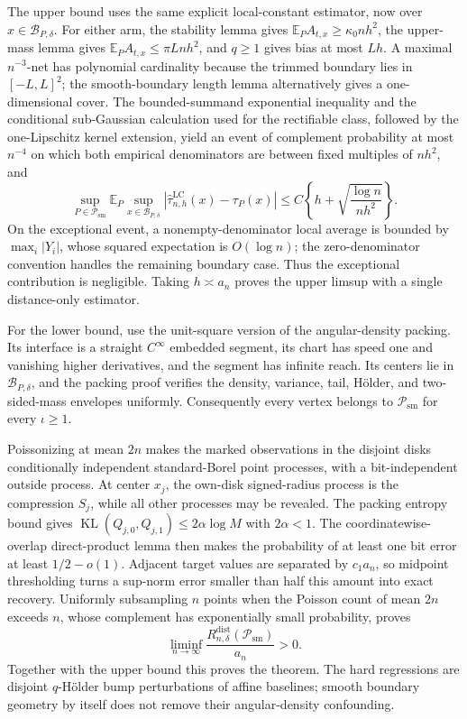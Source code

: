 The upper bound uses the same explicit local-constant estimator, now over \(x\in\mathcal B_{P,\delta}\).  For either arm, the stability lemma gives
\(\mathbb E_PA_{t,x}\geq\kappa_0nh^2\), the upper-mass lemma gives \(\mathbb E_PA_{t,x}\leq\pi Lnh^2\), and \(q\geq1\) gives bias at most \(Lh\).  A maximal \(n^{-3}\)-net has polynomial cardinality because the trimmed boundary lies in \([-L,L]^2\); the smooth-boundary length lemma alternatively gives a one-dimensional cover.  The bounded-summand exponential inequality and the conditional sub-Gaussian calculation used for the rectifiable class, followed by the one-Lipschitz kernel extension, yield an event of complement probability at most \(n^{-4}\) on which both empirical denominators are between fixed multiples of \(nh^2\), and
\[
 \sup_{P\in\mathcal P_{\mathrm{sm}}}
 \mathbb E_P\sup_{x\in\mathcal B_{P,\delta}}
 |\widehat\tau^{\mathrm{LC}}_{n,h}(x)-\tau_P(x)|
 \leq C\left\{h+\sqrt{\frac{\log n}{nh^2}}\right\}.
\]
On the exceptional event, a nonempty-denominator local average is bounded by \(\max_i|Y_i|\), whose squared expectation is \(O(\log n)\); the zero-denominator convention handles the remaining boundary case.  Thus the exceptional contribution is negligible.  Taking \(h\asymp a_n\) proves the upper limsup with a single distance-only estimator.

For the lower bound, use the unit-square version of the angular-density packing.  Its interface is a straight \(C^\infty\) embedded segment, its chart has speed one and vanishing higher derivatives, and the segment has infinite reach.  Its centers lie in \(\mathcal B_{P,\delta}\), and the packing proof verifies the density, variance, tail, H\"older, and two-sided-mass envelopes uniformly.  Consequently every vertex belongs to \(\mathcal P_{\mathrm{sm}}\) for every \(\iota\geq1\).

Poissonizing at mean \(2n\) makes the marked observations in the disjoint disks conditionally independent standard-Borel point processes, with a bit-independent outside process.  At center \(x_j\), the own-disk signed-radius process is the compression \(S_j\), while all other processes may be revealed.  The packing entropy bound gives
\(\operatorname{KL}(Q_{j,0},Q_{j,1})\leq2\alpha\log M\) with \(2\alpha<1\).  The coordinatewise-overlap direct-product lemma then makes the probability of at least one bit error at least \(1/2-o(1)\).  Adjacent target values are separated by \(c_1a_n\), so midpoint thresholding turns a sup-norm error smaller than half this amount into exact recovery.  Uniformly subsampling \(n\) points when the Poisson count of mean \(2n\) exceeds \(n\), whose complement has exponentially small probability, proves
\[
 \liminf_{n\to\infty}
 \frac{R_{n,\delta}^{\mathrm{dist}}(\mathcal P_{\mathrm{sm}})}{a_n}>0.
\]
Together with the upper bound this proves the theorem.  The hard regressions are disjoint \(q\)-H\"older bump perturbations of affine baselines; smooth boundary geometry by itself does not remove their angular-density confounding.